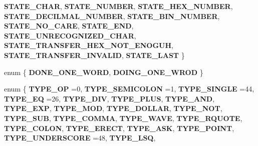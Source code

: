 \begin{DoxyCompactItemize}
{\bfseries S\+T\+A\+T\+E\+\_\+\+C\+H\+AR}, 
\newline
{\bfseries S\+T\+A\+T\+E\+\_\+\+N\+U\+M\+B\+ER}, 
{\bfseries S\+T\+A\+T\+E\+\_\+\+H\+E\+X\+\_\+\+N\+U\+M\+B\+ER}, 
{\bfseries S\+T\+A\+T\+E\+\_\+\+D\+E\+C\+I\+L\+M\+A\+L\+\_\+\+N\+U\+M\+B\+ER}, 
{\bfseries S\+T\+A\+T\+E\+\_\+\+B\+I\+N\+\_\+\+N\+U\+M\+B\+ER}, 
\newline
{\bfseries S\+T\+A\+T\+E\+\_\+\+N\+O\+\_\+\+C\+A\+RE}, 
{\bfseries S\+T\+A\+T\+E\+\_\+\+E\+ND}, 
{\bfseries S\+T\+A\+T\+E\+\_\+\+U\+N\+R\+E\+C\+O\+G\+N\+I\+Z\+E\+D\+\_\+\+C\+H\+AR}, 
{\bfseries S\+T\+A\+T\+E\+\_\+\+T\+R\+A\+N\+S\+F\+E\+R\+\_\+\+H\+E\+X\+\_\+\+N\+O\+T\+\_\+\+E\+N\+O\+G\+UH}, 
\newline
{\bfseries S\+T\+A\+T\+E\+\_\+\+T\+R\+A\+N\+S\+F\+E\+R\+\_\+\+I\+N\+V\+A\+L\+ID}, 
{\bfseries S\+T\+A\+T\+E\+\_\+\+L\+A\+ST}
 \}
\item 
\mbox{\label{classx2_1_1_lexical_parser_ac5ee05b7590effdd000a1ea82e16fe35}} 
enum \{ {\bfseries D\+O\+N\+E\+\_\+\+O\+N\+E\+\_\+\+W\+O\+RD}, 
{\bfseries D\+O\+I\+N\+G\+\_\+\+O\+N\+E\+\_\+\+W\+R\+OD}
 \}
\item 
\mbox{\label{classx2_1_1_lexical_parser_a74d54e4dc992530d4bcd4aab4c8da6f8}} 
enum \{ \newline
{\bfseries T\+Y\+P\+E\+\_\+\+OP} =0, 
{\bfseries T\+Y\+P\+E\+\_\+\+S\+E\+M\+I\+C\+O\+L\+ON} =1, 
{\bfseries T\+Y\+P\+E\+\_\+\+S\+I\+N\+G\+LE} =44, 
{\bfseries T\+Y\+P\+E\+\_\+\+EQ} =26, 
\newline
{\bfseries T\+Y\+P\+E\+\_\+\+D\+IV}, 
{\bfseries T\+Y\+P\+E\+\_\+\+P\+L\+US}, 
{\bfseries T\+Y\+P\+E\+\_\+\+A\+ND}, 
{\bfseries T\+Y\+P\+E\+\_\+\+E\+XP}, 
\newline
{\bfseries T\+Y\+P\+E\+\_\+\+M\+OD}, 
{\bfseries T\+Y\+P\+E\+\_\+\+D\+O\+L\+L\+AR}, 
{\bfseries T\+Y\+P\+E\+\_\+\+N\+OT}, 
{\bfseries T\+Y\+P\+E\+\_\+\+S\+UB}, 
\newline
{\bfseries T\+Y\+P\+E\+\_\+\+C\+O\+M\+MA}, 
{\bfseries T\+Y\+P\+E\+\_\+\+W\+A\+VE}, 
{\bfseries T\+Y\+P\+E\+\_\+\+R\+Q\+U\+O\+TE}, 
{\bfseries T\+Y\+P\+E\+\_\+\+C\+O\+L\+ON}, 
\newline
{\bfseries T\+Y\+P\+E\+\_\+\+E\+R\+E\+CT}, 
{\bfseries T\+Y\+P\+E\+\_\+\+A\+SK}, 
{\bfseries T\+Y\+P\+E\+\_\+\+P\+O\+I\+NT}, 
{\bfseries T\+Y\+P\+E\+\_\+\+U\+N\+D\+E\+R\+S\+C\+O\+RE} =48, 
\newline
{\bfseries T\+Y\+P\+E\+\_\+\+L\+SQ}, 

\end{DoxyCompactItemize}
